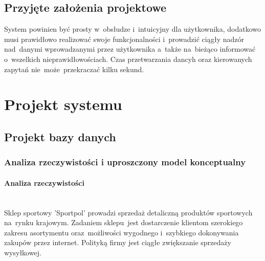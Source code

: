 \documentclass[a4paper, 12pt]{article}
\begin{document}
\subsection{Przyjęte założenia projektowe}
System powinien być prosty w~obsłudze i~intuicyjny dla użytkownika, dodatkowo musi prawidłowo realizować swoje funkcjonalności i~prowadzić ciągły nadzór nad~danymi wprowadzanymi przez użytkownika a~także na~bieżąco informować o~wszelkich nieprawidłowościach. Czas przetwarzania dancyh oraz kierowanych zapytań nie~może~przekraczać kilku sekund.
\section{Projekt systemu}
\subsection{Projekt bazy danych}
\subsubsection{Analiza rzeczywistości i uproszczony model konceptualny}
\paragraph{Analiza rzeczywistości} \mbox{}\\
Sklep sportowy 'Sportpol' prowadzi sprzedaż detaliczną produktów sportowych na~rynku krajowym. Zadaniem sklepu~jest dostarczenie klientom szerokiego zakresu asortymentu oraz~możliwości wygodnego i~szybkiego dokonywania zakupów przez internet. Polityką firmy jest ciągłe zwiększanie sprzedaży wysyłkowej.
\end{document}
